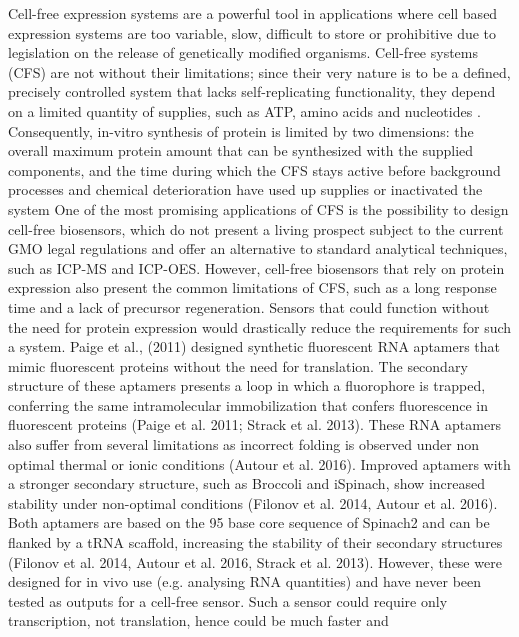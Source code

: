 Cell-free expression systems are a powerful tool in applications where cell
based expression systems are too variable, slow, difficult to store or
prohibitive due to legislation on the release of genetically modified organisms.
Cell-free systems (CFS) are not without their limitations; since their very
nature is to be a defined, precisely controlled system that lacks
self-replicating functionality, they depend on a limited quantity of supplies,
such as ATP, amino acids and nucleotides \cite{kwon2015high}. Consequently,
in-vitro synthesis of protein is limited by two dimensions: the overall maximum
protein amount that can be synthesized with the supplied components, and the
time during which the CFS stays active before background processes and chemical
deterioration have used up supplies or inactivated the system
\cite{carlson2012cell,bernhard2013cell,kwon2015high} One of the most promising
applications of CFS is the possibility to design cell-free biosensors, which do
not present a living prospect subject to the current GMO legal regulations and
offer an alternative to standard analytical techniques, such as ICP-MS and
ICP-OES. However, cell-free biosensors that rely on protein expression also
present the common limitations of CFS, such as a long response time and a lack
of precursor regeneration. Sensors that could function without the need for
protein expression would drastically reduce the requirements for such a system.
Paige et al., (2011) designed synthetic fluorescent RNA aptamers that mimic
fluorescent proteins without the need for translation. The secondary structure
of these aptamers presents a loop in which a fluorophore is trapped, conferring
the same intramolecular immobilization that confers fluorescence in fluorescent
proteins (Paige et al. 2011; Strack et al. 2013). These RNA aptamers also suffer
from several limitations as incorrect folding is observed under non optimal
thermal or ionic conditions (Autour et al. 2016). Improved aptamers with a
stronger secondary structure, such as Broccoli and iSpinach, show increased
stability under non-optimal conditions (Filonov et al. 2014, Autour et al.
2016). Both aptamers are based on the 95 base core sequence of Spinach2 and can
be flanked by a tRNA scaffold, increasing the stability of their secondary
structures (Filonov et al. 2014, Autour et al. 2016, Strack et al. 2013).
However, these were designed for in vivo use (e.g. analysing RNA quantities) and
have never been tested as outputs for a cell-free sensor. Such a sensor could
require only transcription, not translation, hence could be much faster and
